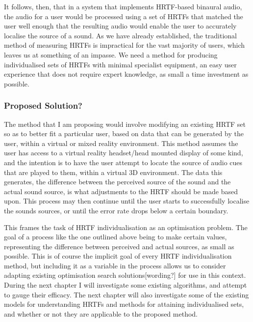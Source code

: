 It follows, then, that in a system that implements HRTF-based binaural audio, the audio for a user would be processed using a set of HRTFs that matched the user well enough that the resulting audio would enable the user to accurately localise the source of a sound. As we have already established, the traditional method of measuring HRTFs is impractical for the vast majority of users, which leaves us at something of an impasse. We need a method for producing individualised sets of HRTFs with minimal specialist equipment, an easy user experience that does not require expert knowledge, as small a time investment as possible. 

\subsubsection{Proposed Solution?}
The method that I am proposing would involve modifying an existing HRTF set so as to better fit a particular user, based on data that can be generated by the user, within a virtual or mixed reality environment. This method assumes the user has access to a virtual reality headset/head mounted display of some kind, and the intention is to have the user attempt to locate the source of audio cues that are played to them, within a virtual 3D environment. The data this generates, the difference between the perceived source of the sound and the actual sound source, is what adjustments to the HRTF should be made based upon. This process may then continue until the user starts to successfully localise the sounds sources, or until the error rate drops below a certain boundary. 

This frames the task of HRTF individualisation as an optimisation problem. The goal of a process like the one outlined above being to make certain values, representing the difference between perceived and actual sources, as small as possible. This is of course the implicit goal of every HRTF individualisation method, but including it as a variable in the process allows us to consider adapting existing optimisation search solutions[wording?] for use in this context. During the next chapter I will investigate some existing algorithms, and attempt to gauge their efficacy. The next chapter will also investigate some of the existing models for understanding HRTFs and methods for attaining individualised sets, and whether or not they are applicable to the proposed method. 




